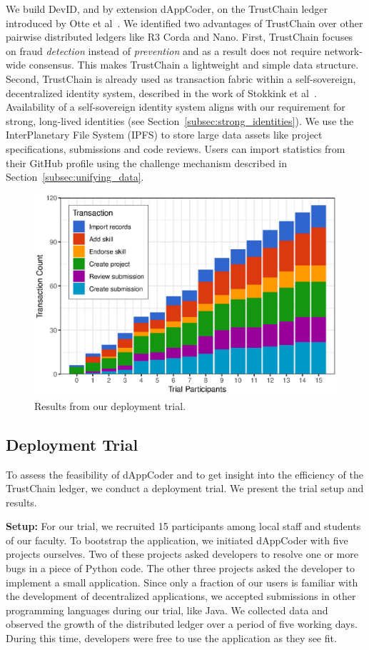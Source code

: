We build DevID, and by extension dAppCoder, on the TrustChain ledger introduced by Otte et al~\cite{otte2017trustchain}.
We identified two advantages of TrustChain over other pairwise distributed ledgers like R3 Corda and Nano.
First, TrustChain focuses on fraud \emph{detection} instead of \emph{prevention} and as a result does not require network-wide consensus.
This makes TrustChain a lightweight and simple data structure.
Second, TrustChain is already used as transaction fabric within a self-sovereign, decentralized identity system, described in the work of Stokkink et al~\cite{stokkink2018deployment}.
Availability of a self-sovereign identity system aligns with our requirement for strong, long-lived identities (see Section~\ref{subsec:strong_identities}).
We use the InterPlanetary File System (IPFS) to store large data assets like project specifications, submissions and code reviews.
Users can import statistics from their GitHub profile using the challenge mechanism described in Section~\ref{subsec:unifying_data}.

\begin{figure}[t!]
	\centering
	\includegraphics[width=.75\columnwidth]{devid/resources/experiment/experiment_1_unit.eps}
	\caption{Results from our deployment trial.}
	\label{fig:experiment_graph}
\end{figure}

\subsection{Deployment Trial}
To assess the feasibility of dAppCoder and to get insight into the efficiency of the TrustChain ledger, we conduct a deployment trial.
We present the trial setup and results.

\textbf{Setup:}
For our trial, we recruited 15 participants among local staff and students of our faculty.
To bootstrap the application, we initiated dAppCoder with five projects ourselves.
Two of these projects asked developers to resolve one or more bugs in a piece of Python code.
The other three projects asked the developer to implement a small application.
Since only a fraction of our users is familiar with the development of decentralized applications, we accepted submissions in other programming languages during our trial, like Java.
We collected data and observed the growth of the distributed ledger over a period of five working days.
During this time, developers were free to use the application as they see fit.

